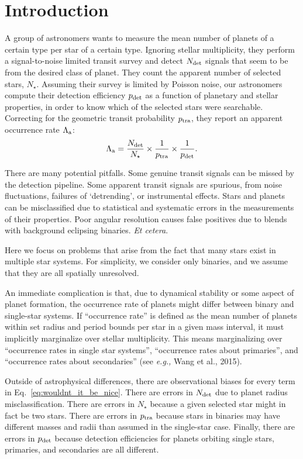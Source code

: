 \section{Introduction}

A group of astronomers wants to measure the mean number of planets of a 
certain type per star of a certain type.
Ignoring stellar multiplicity, they perform a signal-to-noise limited transit 
survey and detect $N_{\rm det}$ signals that seem to be from the desired 
class of planet.
They count the apparent number of selected stars, $N_\star$.
Assuming their survey is limited by Poisson noise, our astronomers compute 
their detection efficiency $p_{\rm det}$ as a function of planetary and 
stellar properties, in order to know which of the selected stars were
searchable.
Correcting for the geometric transit probability $p_{\rm tra}$, they report an 
apparent occurrence rate $\Lambda_{\rm a}$:
\begin{equation}
\Lambda_{\rm a} = \frac{N_{\rm det}}{N_\star} \times \frac{1}{p_{\rm tra}}
								  \times \frac{1}{p_{\rm det}}.
\label{eq:wouldnt_it_be_nice}
\end{equation}

There are many potential pitfalls.  Some genuine transit signals can be missed
by the detection pipeline.  Some apparent transit signals are spurious, from
noise fluctuations, failures of `detrending', or instrumental effects.  Stars
and planets can be misclassified due to statistical and systematic errors in
the measurements of their properties.  Poor angular resolution causes false
positives due to blends with background eclipsing binaries. {\it Et cetera}.

Here we focus on problems that arise from the fact that many stars exist in 
multiple star systems.
For simplicity, we consider only binaries, and we assume that they are all 
spatially unresolved.

An immediate complication is that, due to dynamical stability or some 
aspect of planet formation, the occurrence rate of planets might differ 
between binary and single-star systems.
If ``occurrence rate'' is defined as the mean number of planets within 
set radius and period bounds per star in a given mass interval, it must 
implicitly marginalize over stellar multiplicity.
This means marginalizing over ``occurrence rates in single star systems'', 
``occurrence rates about primaries'', and
``occurrence rates about secondaries'' (see {\it e.g.,} Wang et al., 
2015).

Outside of astrophysical differences, there are observational biases for every 
term in Eq.~\ref{eq:wouldnt_it_be_nice}.
There are errors in $N_{\rm det}$ due to planet radius misclassification.
There are errors in $N_\star$ because a given selected star might in fact be 
two stars.
There are errors in $p_{\rm tra}$ because stars in binaries may have different 
masses and radii than assumed in the single-star case.
Finally, there are errors in $p_{\rm det}$ because detection efficiencies 
for planets orbiting single stars, primaries, and secondaries are all 
different.

